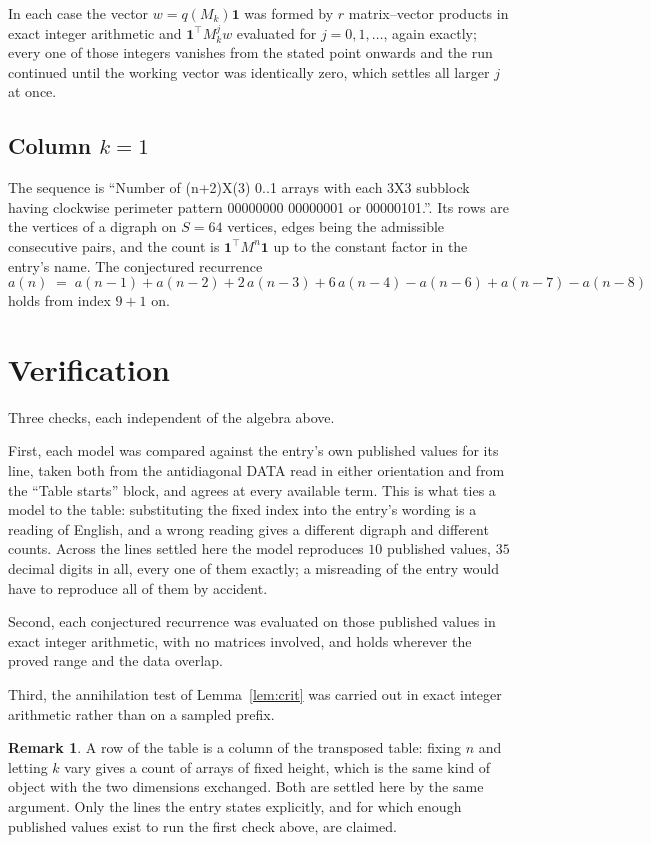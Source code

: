 \documentclass[11pt,a4paper]{article}
\theoremstyle{plain}
\theoremstyle{definition}
\newtheorem{remark}[theorem]{Remark}
\begin{document}
In each case the vector $w=q(M_k)\mathbf{1}$ was formed by $r$ matrix--vector products in
exact integer arithmetic and $\mathbf{1}^{\!\top}M_k^{j}w$ evaluated for $j=0,1,\dots$,
again exactly; every one of those integers vanishes from the stated point onwards and the run
continued until the working vector was identically zero, which settles all larger $j$ at once.

\subsection*{Column $k$$=1$}
The sequence is ``Number of (n+2)X(3) 0..1 arrays with each 3X3 subblock having clockwise perimeter pattern 00000000 00000001 or 00000101.''. Its rows are the vertices of a digraph on
$S=64$ vertices, edges being the admissible consecutive pairs, and the count is
$\mathbf{1}^{\!\top}M^{n}\mathbf{1}$ up to the constant factor in the entry's name.
The conjectured recurrence
\[
a(n)\;=\;a(n-1) + a(n-2) + 2\,a(n-3) + 6\,a(n-4) - a(n-6) + a(n-7) - a(n-8)
\]
holds from index $9+1$ on.

\section{Verification}

Three checks, each independent of the algebra above.

First, each model was compared against the entry's own published values for its line, taken
both from the antidiagonal DATA read in either orientation and from the ``Table starts''
block, and agrees at every available term. This is what ties a model to the table:
substituting the fixed index into the entry's wording is a reading of English, and a wrong
reading gives a different digraph and different counts. Across the lines settled here the
model reproduces $10$ published values, $35$ decimal digits in all, every one of
them exactly; a misreading of the entry would have to reproduce all of them by accident.

Second, each conjectured recurrence was evaluated on those published values in exact
integer arithmetic, with no matrices involved, and holds wherever the proved range and the
data overlap.

Third, the annihilation test of Lemma~\ref{lem:crit} was carried out in exact integer
arithmetic rather than on a sampled prefix.

\begin{remark}
A row of the table is a column of the transposed table: fixing $n$ and letting $k$ vary gives a
count of arrays of fixed height, which is the same kind of object with the two dimensions
exchanged. Both are settled here by the same argument. Only the lines the entry states
explicitly, and for which enough published values exist to run the first check above, are
claimed.
\end{remark}
\end{document}
